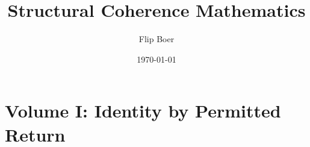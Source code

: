 \documentclass[12pt, oneside]{book}
\title{Structural Coherence Mathematics}
\author{Flip Boer}
\date{\today}
\theoremstyle{definition}
\begin{document}
\maketitle
\tableofcontents

\part{Volume I: Identity by Permitted Return}





\appendix

\end{document}
